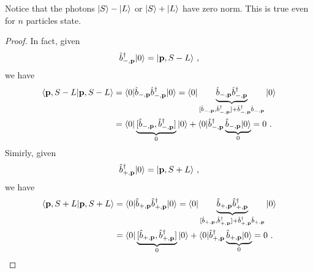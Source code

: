    Notice that the photons $\vert S\rangle - \vert L\rangle$ or $\vert S\rangle + \vert L\rangle$ have zero norm. This is true even for $n$ particles state.
    \begin{proof}
        In fact, given
        \begin{equation*}
            \hat b_{-, \mathbf p}^\dagger \vert0\rangle = \vert\mathbf p, S - L\rangle ~,
        \end{equation*}
        we have 
        \begin{equation*}
        \begin{aligned}
            \langle\mathbf p, S-L\vert\mathbf p, S-L\rangle & = \langle0\vert \hat b_{-, \mathbf p} \hat b_{-, \mathbf p}^\dagger \vert0\rangle = \langle0\vert \underbrace{\hat b_{-, \mathbf p} \hat b_{-, \mathbf p}^\dagger}_{[\hat b_{-, \mathbf p} , \hat b_{-, \mathbf p}^\dagger] + \hat b_{-, \mathbf p}^\dagger \hat b_{-, \mathbf p}} \vert0\rangle \\ & = \langle0\vert \underbrace{[\hat b_{-, \mathbf p} , \hat b_{-, \mathbf p}^\dagger]}_0 \vert0\rangle + \langle0\vert \hat b_{-, \mathbf p}^\dagger \underbrace{\hat b_{-, \mathbf p} \vert0\rangle}_0 = 0 ~.
        \end{aligned}
        \end{equation*}
        Simirly, given
        \begin{equation*}
            \hat b_{+, \mathbf p}^\dagger \vert0\rangle = \vert\mathbf p, S + L\rangle ~,
        \end{equation*}
        we have 
        \begin{equation*}
        \begin{aligned}
            \langle\mathbf p, S+L\vert\mathbf p, S+L\rangle & = \langle0\vert \hat b_{+, \mathbf p} \hat b_{+, \mathbf p}^\dagger \vert0\rangle = \langle0\vert \underbrace{\hat b_{+, \mathbf p} \hat b_{+, \mathbf p}^\dagger}_{[\hat b_{+, \mathbf p} , \hat b_{+, \mathbf p}^\dagger] + \hat b_{+, \mathbf p}^\dagger \hat b_{+, \mathbf p}} \vert0\rangle \\ & = \langle0\vert \underbrace{[\hat b_{+, \mathbf p} , \hat b_{+, \mathbf p}^\dagger]}_0 \vert0\rangle + \langle0\vert \hat b_{+, \mathbf p}^\dagger \underbrace{\hat b_{+, \mathbf p} \vert0\rangle}_0 = 0 ~.
        \end{aligned}
        \end{equation*}
    \end{proof}

